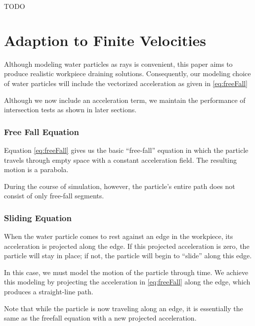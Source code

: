 TODO

\section{Adaption to Finite Velocities}

Although modeling water particles as rays is convenient, this paper aims to produce realistic workpiece draining solutions. Consequently, our modeling choice of water particles will include the vectorized acceleration as given in \eqref{eq:freeFall}


Although we now include an acceleration term, we maintain the performance of intersection tests as shown in later sections.

		\subsubsection{Free Fall Equation}

Equation \eqref{eq:freeFall} gives us the basic ``free-fall'' equation in which the particle travels through empty space with a constant acceleration field. The resulting motion is a parabola.


During the course of simulation, however, the particle's entire path does not consist of only free-fall segments.

		\subsubsection{Sliding Equation}

When the water particle comes to rest against an edge in the workpiece, its acceleration is projected along the edge. If this projected acceleration is zero, the particle will stay in place; if not, the particle will begin to ``slide'' along this edge.

In this case, we must model the motion of the particle through time. We achieve this modeling by projecting the acceleration in \eqref{eq:freeFall} along the edge, which produces a straight-line path.

Note that while the particle is now traveling along an edge, it is essentially the same as the freefall equation with a new projected acceleration.

